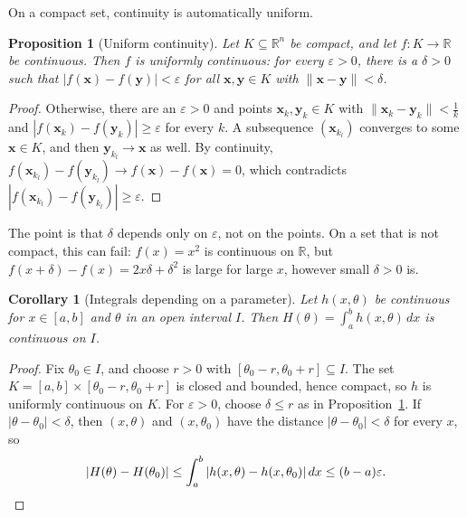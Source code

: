 \documentclass[11pt]{article}
\newcommand{\norm}[1]{\lVert #1 \rVert}
\theoremstyle{definition}
\theoremstyle{plain}
\newtheorem{proposition}[definition]{Proposition}
\newtheorem{corollary}[definition]{Corollary}
\theoremstyle{remark}
\begin{document}
On a compact set, continuity is automatically uniform.

\begin{proposition}[Uniform continuity]\label{prop:uniform-continuity}
    Let $K \subseteq \mathbb{R}^n$ be compact, and let $f: K \to \mathbb{R}$ be continuous. Then $f$ is uniformly continuous: for every $\varepsilon > 0$, there is a $\delta > 0$ such that $|f(\mathbf{x}) - f(\mathbf{y})| < \varepsilon$ for all $\mathbf{x}, \mathbf{y} \in K$ with $\norm{\mathbf{x} - \mathbf{y}} < \delta$.
\end{proposition}

\begin{proof}
    Otherwise, there are an $\varepsilon > 0$ and points $\mathbf{x}_k, \mathbf{y}_k \in K$ with $\norm{\mathbf{x}_k - \mathbf{y}_k} < \frac{1}{k}$ and $|f(\mathbf{x}_k) - f(\mathbf{y}_k)| \geq \varepsilon$ for every $k$. A subsequence $(\mathbf{x}_{k_l})$ converges to some $\mathbf{x} \in K$, and then $\mathbf{y}_{k_l} \to \mathbf{x}$ as well. By continuity, $f(\mathbf{x}_{k_l}) - f(\mathbf{y}_{k_l}) \to f(\mathbf{x}) - f(\mathbf{x}) = 0$, which contradicts $|f(\mathbf{x}_{k_l}) - f(\mathbf{y}_{k_l})| \geq \varepsilon$.
\end{proof}

The point is that $\delta$ depends only on $\varepsilon$, not on the points. On a set that is not compact, this can fail: $f(x) = x^2$ is continuous on $\mathbb{R}$, but $f(x + \delta) - f(x) = 2x\delta + \delta^2$ is large for large $x$, however small $\delta > 0$ is.

\begin{corollary}[Integrals depending on a parameter]\label{cor:parameter-integrals}
    Let $h(x, \theta)$ be continuous for $x \in [a, b]$ and $\theta$ in an open interval $I$. Then $H(\theta) = \int_a^b h(x, \theta)\, dx$ is continuous on $I$.
\end{corollary}

\begin{proof}
    Fix $\theta_0 \in I$, and choose $r > 0$ with $[\theta_0 - r, \theta_0 + r] \subseteq I$. The set $K = [a, b] \times [\theta_0 - r, \theta_0 + r]$ is closed and bounded, hence compact, so $h$ is uniformly continuous on $K$. For $\varepsilon > 0$, choose $\delta \leq r$ as in Proposition~\ref{prop:uniform-continuity}. If $|\theta - \theta_0| < \delta$, then $(x, \theta)$ and $(x, \theta_0)$ have the distance $|\theta - \theta_0| < \delta$ for every $x$, so
    \[|H(\theta) - H(\theta_0)| \leq \int_a^b |h(x, \theta) - h(x, \theta_0)|\, dx \leq (b - a)\varepsilon. \qedhere\]
\end{proof}
\end{document}
